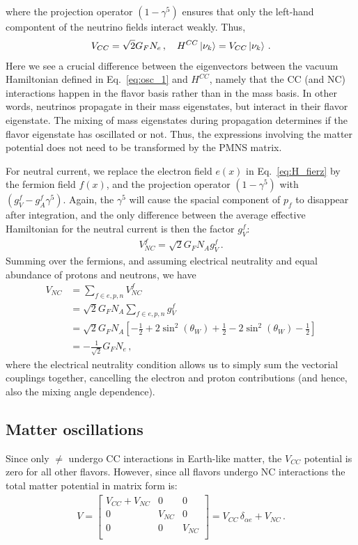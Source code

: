 \documentclass[draft=True]{revtex4-2}
\begin{document}
where the projection operator $(1- \gamma^5)$ ensures that only the left-hand compontent of the neutrino fields interact weakly. Thus,
\begin{align}\label{eq:V_CC1}
    V_{CC} = \sqrt{2}G_F N_e\,, \quad H^{CC}\ket{\nu_k} = V_{CC}\ket{\nu_k}\,.
\end{align}
Here we see a crucial difference between the eigenvectors between the vacuum Hamiltonian defined in Eq.~\ref{eq:osc_1} and $H^{CC}$, namely
that the CC (and NC) interactions happen in the flavor basis rather than in the mass basis. In other words,
neutrinos propagate in their mass eigenstates, but interact in their flavor eigenstate. The mixing of mass eigenstates during propagation
determines if the flavor eigenstate has oscillated or not. Thus, the expressions involving the 
matter potential does not need to be transformed by the PMNS matrix.

For neutral current, we replace the electron field $e(x)$ in Eq.~\ref{eq:H_fierz} by the fermion field $f(x)$, and the projection operator 
$(1-\gamma^5)$ with $(g_V^f - g_A^f\gamma^5)$. Again, the $\gamma^5$ will cause the spacial component of $p_f$ to disappear after integration, and the 
only difference between the average effective Hamiltonian for the neutral current is then the factor $g_V^f$:
\begin{align}
    V^f_{NC} = \sqrt{2}G_F N_A g_V^f\,.
\end{align}
Summing over the fermions, and assuming electrical neutrality and equal abundance of protons and neutrons, we have
\begin{align}
    V_{NC} &= \sum_{f \in {e,p,n}} V^f_{NC} \nonumber \\
           &= \sqrt{2}G_F N_A \sum_{f \in {e,p,n}} g_V^f \nonumber \\
           &= \sqrt{2}G_F N_A\left[ -\frac{1}{2}+2\sin^2{(\theta_W)} + \frac{1}{2}-2\sin^2{(\theta_W)} -\frac{1}{2} \right] \nonumber \\
           &= -\frac{1}  {\sqrt{2}} G_F N_e\,,
\end{align}
where the electrical neutrality condition allows us to simply sum the vectorial couplings together, cancelling the electron and proton contributions (and hence, also the mixing angle dependence).
\subsection{Matter oscillations}
Since only $\ne$ undergo CC interactions in Earth-like matter, the $V_{CC}$ potential is zero for all other flavors. However, since all flavors undergo NC interactions the total matter potential in matrix form is:
\begin{align}\label{V_matrix}
    V = \begin{bmatrix}
        V_{CC} + V_{NC} & 0 & 0 \\
        0 & V_{NC} & 0 \\
        0 & 0 & V_{NC} \\
    \end{bmatrix} = V_{CC}\, \delta_{\alpha e} + V_{NC}\,.
\end{align}
\end{document}
